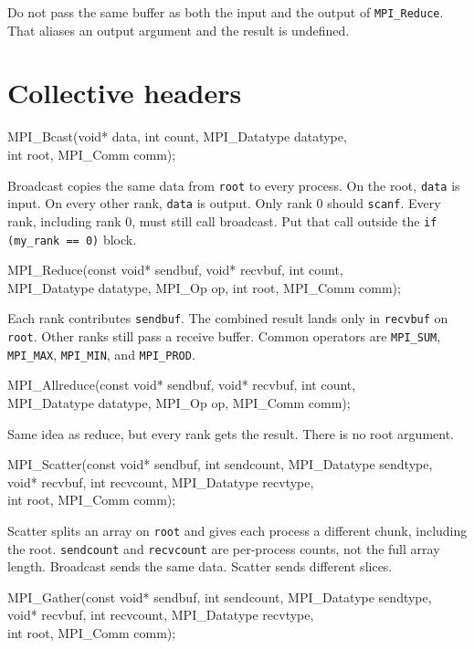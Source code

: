\documentclass[9pt,letterpaper]{extarticle}
\newcommand{\sig}[1]{%
  \par\vspace{1pt}%
  \noindent\colorbox{codebg}{\parbox{\dimexpr\linewidth-2\fboxsep\relax}{%
    \raggedright\ttfamily\footnotesize #1}}%
  \par\vspace{1pt}%
}
\begin{document}
Do not pass the same buffer as both the input and the output of \texttt{MPI\_Reduce}. That aliases an output argument and the result is undefined.

\section{Collective headers}
\sig{MPI\_Bcast(void* data, int count, MPI\_Datatype datatype,\\
\hspace*{1em}int root, MPI\_Comm comm);}

Broadcast copies the same data from \texttt{root} to every process. On the root, \texttt{data} is input. On every other rank, \texttt{data} is output. Only rank 0 should \texttt{scanf}. Every rank, including rank 0, must still call broadcast. Put that call outside the \texttt{if (my\_rank == 0)} block.

\sig{MPI\_Reduce(const void* sendbuf, void* recvbuf, int count,\\
\hspace*{1em}MPI\_Datatype datatype, MPI\_Op op, int root, MPI\_Comm comm);}

Each rank contributes \texttt{sendbuf}. The combined result lands only in \texttt{recvbuf} on \texttt{root}. Other ranks still pass a receive buffer. Common operators are \texttt{MPI\_SUM}, \texttt{MPI\_MAX}, \texttt{MPI\_MIN}, and \texttt{MPI\_PROD}.

\sig{MPI\_Allreduce(const void* sendbuf, void* recvbuf, int count,\\
\hspace*{1em}MPI\_Datatype datatype, MPI\_Op op, MPI\_Comm comm);}

Same idea as reduce, but every rank gets the result. There is no root argument.

\sig{MPI\_Scatter(const void* sendbuf, int sendcount, MPI\_Datatype sendtype,\\
\hspace*{1em}void* recvbuf, int recvcount, MPI\_Datatype recvtype,\\
\hspace*{1em}int root, MPI\_Comm comm);}

Scatter splits an array on \texttt{root} and gives each process a different chunk, including the root. \texttt{sendcount} and \texttt{recvcount} are per-process counts, not the full array length. Broadcast sends the same data. Scatter sends different slices.

\sig{MPI\_Gather(const void* sendbuf, int sendcount, MPI\_Datatype sendtype,\\
\hspace*{1em}void* recvbuf, int recvcount, MPI\_Datatype recvtype,\\
\hspace*{1em}int root, MPI\_Comm comm);}
\end{document}
